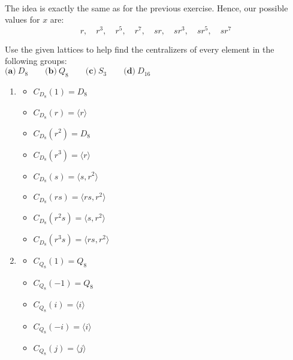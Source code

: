 \begin{solution}
    \\ The idea is exactly the same as for the previous exercise. Hence, our possible values for $x$ are:
    $$r, \quad r^3, \quad r^5, \quad r^7, \quad sr, \quad sr^3, \quad sr^5, \quad sr^7$$
\end{solution}

\begin{exercise}
    Use the given lattices to help find the centralizers of every element in the following groups:\\
    $\textbf{(a)} \ D_8 \qquad \textbf{(b)} \ Q_8 \qquad \textbf{(c)} \ S_3 \qquad \textbf{(d)} \ D_{16} $ \\
\end{exercise}

\begin{solution}
    \begin{enumerate}[label = \textbf{(\alph*)}]
        \item \begin{multicols}{3}\begin{itemize}
            \item $C_{D_8}(1) = D_8$
            \item $C_{D_8}(r) = \langle r \rangle$
            \item $C_{D_8}(r^2) = D_8$
            \item $C_{D_8}(r^3) = \langle r \rangle$
            \item $C_{D_8}(s) = \langle s, r^2 \rangle$
            \item $C_{D_8}(rs) = \langle rs, r^2 \rangle$
            \item $C_{D_8}(r^2s) = \langle s, r^2 \rangle$
            \item $C_{D_8}(r^3s) = \langle rs, r^2 \rangle$
        \end{itemize}
        \end{multicols}
        \item \begin{multicols}{3}\begin{itemize}
            \item $C_{Q_8}(1) = Q_8$
            \item $C_{Q_8}(-1) = Q_8$
            \item $C_{Q_8}(i) = \langle i \rangle$
            \item $C_{Q_8}(-i) = \langle i \rangle$
            \item $C_{Q_8}(j) = \langle j \rangle$

\end{itemize}
\end{multicols}
\end{enumerate}
\end{solution}
